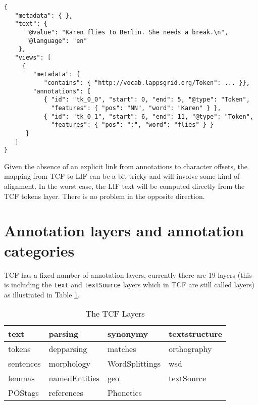 \documentclass[11pt]{article}
\newcommand{\tag}[1]{{\tt #1}}
\newenvironment{example}
    {\begin{tcolorbox}\small}
    {\end{tcolorbox}}
\begin{document}
\begin{example}
\begin{verbatim}
{
   "metadata": { },
   "text": {
      "@value": "Karen flies to Berlin. She needs a break.\n",
      "@language": "en"
    },
   "views": [ 
     {  
        "metadata": {  
           "contains": { "http://vocab.lappsgrid.org/Token": ... }},  
        "annotations": [  
           { "id": "tk_0_0", "start": 0, "end": 5, "@type": "Token",
             "features": { "pos": "NN", "word": "Karen" } },
           { "id": "tk_0_1", "start": 6, "end": 11, "@type": "Token",
             "features": { "pos": ":", "word": "flies" } }
      }
   ]
}
\end{verbatim}
\end{example}

Given the absence of an explicit link from annotations to character offsets, the mapping from TCF to LIF can be a bit tricky and will involve some kind of alignment. In the worst case, the LIF text will be computed directly from the TCF tokens layer. There is no problem in the opposite direction.


\section{Annotation layers and annotation categories}

TCF has a fixed number of annotation layers, currently there are 19 layers (this is including the \tag{text} and \tag{textSource} layers which in TCF are still called layers) as illustrated in Table \ref{table:tcf-layers}.

\begin{table}[ht]
\begin{center}
\begin{tabular}{|l|l|l|l|}
\hline
text		& parsing		& synonymy			& textstructure	\\ \hline
tokens		& depparsing	& matches			& orthography 	\\ \hline
sentences	& morphology	& WordSplittings	& wsd 			\\ \hline
lemmas		& namedEntities	& geo				& textSource	\\ \hline
POStags		& references	& Phonetics			& 				\\ \hline
\end{tabular}
\caption{The TCF Layers}
\label{table:tcf-layers}
\end{center}
\end{table}
\end{document}
